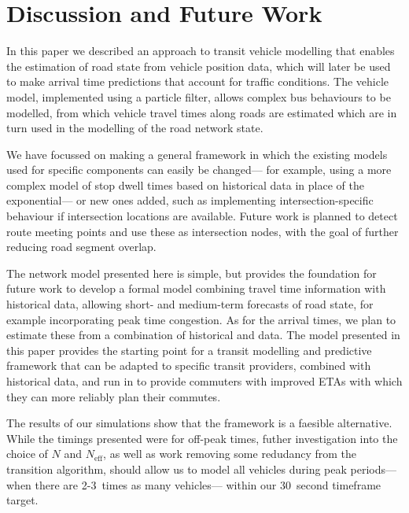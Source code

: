 \section{Discussion and Future Work}
\label{sec:discussion}

In this paper we described an approach to transit vehicle modelling
that enables the \rt estimation of road state from vehicle position data,
which will later be used to make arrival time predictions
that account for \rt traffic conditions.
The vehicle model, implemented using a particle filter,
allows complex bus behaviours to be modelled,
from which 
vehicle travel times along roads are estimated which are in turn used 
in the modelling of the road network state.


We have focussed on making a general framework
in which the existing models used for specific components
can easily be changed---%
for example, using a more complex model of stop dwell times
based on historical data in place of the exponential---%
or new ones added, such as implementing intersection-specific behaviour
if intersection locations are available.
Future work is planned to detect route meeting points
and use these as intersection nodes,
with the goal of further reducing road segment overlap.


The network model presented here is simple, 
but provides the foundation for future work to
develop a formal model combining \rt travel time information with historical data, 
allowing short- and medium-term forecasts of road state,
for example incorporating peak time congestion.
As for the arrival times, 
we plan to estimate these from a combination of historical 
and \rt data.
The model presented in this paper provides the starting point
for a transit modelling and predictive framework
that can be adapted to specific transit providers,
combined with historical data,
and run in \rt to provide commuters with
improved ETAs with which they can more reliably
plan their commutes.


The results of our simulations show that the framework is a 
faesible \rt alternative.
While the timings presented were for off-peak times,
futher investigation into the choice of $N$ and $N_\text{eff}$,
as well as work removing some redudancy from the transition algorithm,
should allow us to model all vehicles during peak periods---%
when there are 2-3~times as many vehicles---%
within our 30~second timeframe target.
